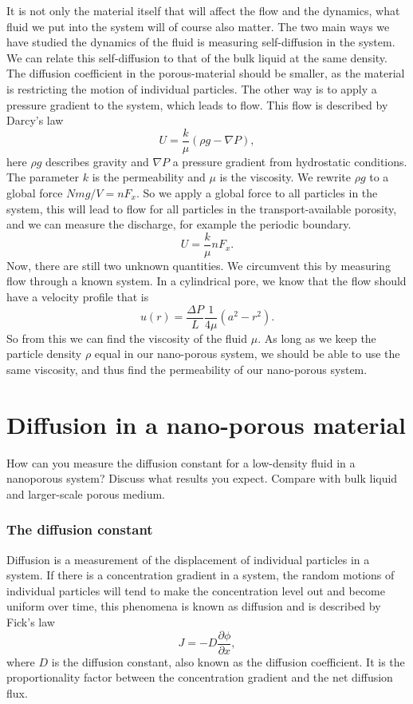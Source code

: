 \documentclass[a4paper, 11pt, notitlepage, english]{article}
\newcommand{\p}{\partial}
\begin{document}
It is not only the material itself that will affect the flow and the dynamics, what fluid we put into the system will of course also matter. The two main ways we have studied the dynamics of the fluid is measuring self-diffusion in the system. We can relate this self-diffusion to that of the bulk liquid at the same density. The diffusion coefficient in the porous-material should be smaller, as the material is restricting the motion of individual particles. The other way is to apply a pressure gradient to the system, which leads to flow. This flow is described by Darcy's law
$$U = \frac{k}{\mu}(\rho g - \nabla P),$$
here $\rho g$ describes gravity and $\nabla P$ a pressure gradient from hydrostatic conditions. The parameter $k$ is the permeability and $\mu$ is the viscosity. We rewrite $\rho g$ to a global force $Nmg/V = nF_x$. So we apply a global force to all particles in the system, this will lead to flow for all particles in the transport-available porosity, and we can measure the discharge, for example the periodic boundary.
$$U = \frac{k}{\mu}nF_x.$$
Now, there are still two unknown quantities. We circumvent this by measuring flow through a known system. In a cylindrical pore, we know that the flow should have a velocity profile that is
$$u(r) = \frac{\Delta P}{L} \frac{1}{4\mu}(a^2 -r^2).$$
So from this we can find the viscosity of the fluid $\mu$. As long as we keep the particle density $\rho$ equal in our nano-porous system, we should be able to use the same viscosity, and thus find the permeability of our nano-porous system.

\clearpage


\section{Diffusion in a nano-porous material}

How can you measure the diffusion constant for a low-density fluid in a nanoporous system? Discuss what results you expect. Compare with bulk liquid and larger-scale porous medium.

\subsubsection*{The diffusion constant}

Diffusion is a measurement of the displacement of individual particles in a system. If there is a concentration gradient in a system, the random motions of individual particles will tend to make the concentration level out and become uniform over time, this phenomena is known as diffusion and is described by Fick's law
$$J = -D\frac{\p \phi}{\p x},$$
where $D$ is the diffusion constant, also known as the diffusion coefficient. It is the proportionality factor between the concentration gradient and the net diffusion flux.
\end{document}
